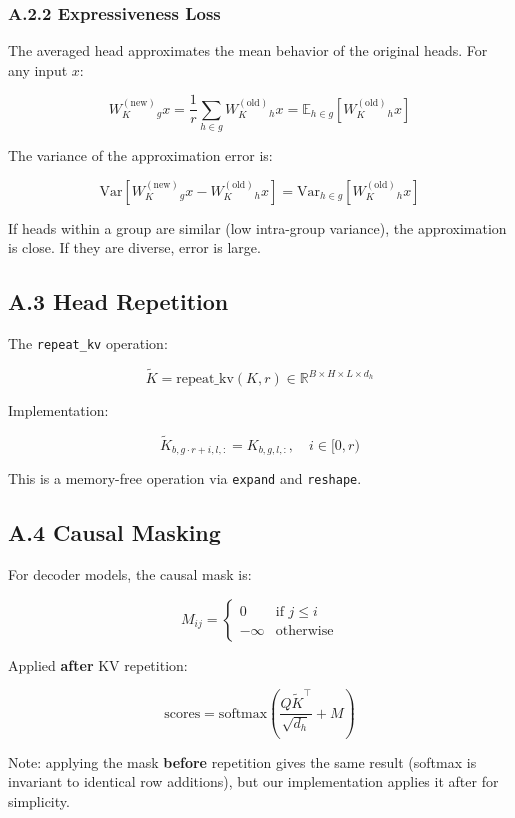 \subsubsection{A.2.2 Expressiveness Loss}

The averaged head approximates the mean behavior of the original heads. 
For any input $x$:

\[
W_K^{(\text{new})}_g x = \frac{1}{r} \sum_{h \in g} W_K^{(\text{old})}_h x = \mathbb{E}_{h \in g}[W_K^{(\text{old})}_h x]
\tag{A.7}
\]

The variance of the approximation error is:

\[
\text{Var}[W_K^{(\text{new})}_g x - W_K^{(\text{old})}_h x] = \text{Var}_{h \in g}[W_K^{(\text{old})}_h x]
\tag{A.8}
\]

If heads within a group are similar (low intra-group variance), the 
approximation is close. If they are diverse, error is large.

\subsection{A.3 Head Repetition}

The \texttt{repeat\_kv} operation:

\[
\tilde{K} = \text{repeat\_kv}(K, r) \in \mathbb{R}^{B \times H \times L \times d_h}
\tag{A.9}
\]

Implementation:

\[
\tilde{K}_{b, g \cdot r + i, l, :} = K_{b, g, l, :}, \quad i \in [0, r)
\tag{A.10}
\]

This is a memory-free operation via \texttt{expand} and \texttt{reshape}.

\subsection{A.4 Causal Masking}

For decoder models, the causal mask is:

\[
M_{ij} = \begin{cases} 0 & \text{if } j \le i \\ -\infty & \text{otherwise} \end{cases}
\tag{A.11}
\]

Applied \textbf{after} KV repetition:

\[
\text{scores} = \text{softmax}\!\left(\frac{Q \tilde{K}^\top}{\sqrt{d_h}} + M\right)
\tag{A.12}
\]

Note: applying the mask \textbf{before} repetition gives the same result 
(softmax is invariant to identical row additions), but our implementation 
applies it after for simplicity.

